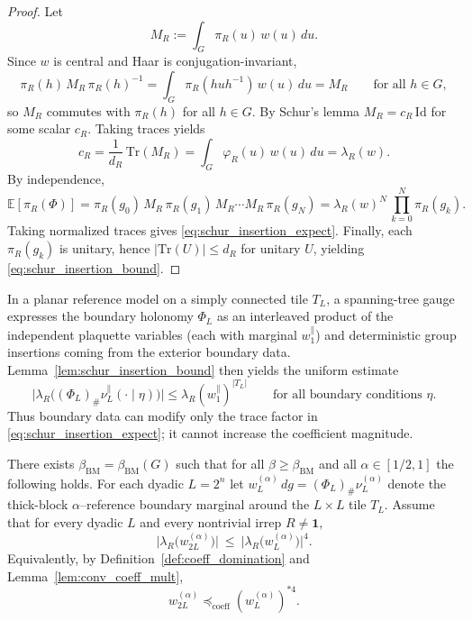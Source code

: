 \begin{proof}
Let
\[
M_R:=\int_G \pi_R(u)\,w(u)\,du.
\]
Since $w$ is central and Haar is conjugation-invariant,
\[
\pi_R(h)\,M_R\,\pi_R(h)^{-1}=\int_G \pi_R(huh^{-1})\,w(u)\,du=M_R
\qquad\text{for all }h\in G,
\]
so $M_R$ commutes with $\pi_R(h)$ for all $h\in G$.
By Schur's lemma $M_R=c_R\,\mathrm{Id}$ for some scalar $c_R$.
Taking traces yields
\[
c_R=\frac{1}{d_R}\,\mathrm{Tr}(M_R)=\int_G \varphi_R(u)\,w(u)\,du=\lambda_R(w).
\]
By independence,
\[
\mathbb E[\pi_R(\Phi)]
=
\pi_R(g_0)\,M_R\,\pi_R(g_1)\,M_R\cdots M_R\,\pi_R(g_N)
=
\lambda_R(w)^N\,\prod_{k=0}^N \pi_R(g_k).
\]
Taking normalized traces gives \eqref{eq:schur_insertion_expect}.
Finally, each $\pi_R(g_k)$ is unitary, hence $|\mathrm{Tr}(U)|\le d_R$ for unitary $U$, yielding \eqref{eq:schur_insertion_bound}.
\end{proof}

\begin{remark}\label{rem:planar_power_uniform_eta}
In a planar reference model on a simply connected tile $T_L$, a spanning-tree gauge expresses the boundary holonomy $\Phi_L$
as an interleaved product of the independent plaquette variables (each with marginal $w_1^{\parallel}$) and deterministic
group insertions coming from the exterior boundary data.
Lemma~\ref{lem:schur_insertion_bound} then yields the uniform estimate
\[
\big|\lambda_R\big((\Phi_L)_\#\nu_L^{\parallel}(\cdot\mid\eta)\big)\big|
\le \lambda_R(w_1^{\parallel})^{|T_L|}
\qquad\text{for all boundary conditions }\eta.
\]
Thus boundary data can modify only the trace factor in \eqref{eq:schur_insertion_expect}; it cannot increase the coefficient magnitude.
\end{remark}


\begin{proposition}\label{prop:BM_dyadic_local}
There exists $\beta_{\mathrm{BM}}=\beta_{\mathrm{BM}}(G)$ such that for all $\beta\ge\beta_{\mathrm{BM}}$ and all $\alpha\in[1/2,1]$ the following holds.
For each dyadic $L=2^n$ let $w_L^{(\alpha)}\,dg=(\Phi_L)_{\#}\nu_{L}^{(\alpha)}$ denote the thick-block $\alpha$--reference boundary marginal around the $L\times L$ tile $T_L$.
Assume that for every dyadic $L$ and every nontrivial irrep $R\neq\mathbf 1$,
\begin{equation}\label{eq:BM_dyadic_step_template}
\big|\lambda_R\!\bigl(w_{2L}^{(\alpha)}\bigr)\big|
\ \le\
\big|\lambda_R\!\bigl(w_{L}^{(\alpha)}\bigr)\big|^{4}.
\end{equation}
\noindent Equivalently, by Definition~\ref{def:coeff_domination} and Lemma~\ref{lem:conv_coeff_mult},
\[
w_{2L}^{(\alpha)} \preceq_{\mathrm{coeff}} (w_L^{(\alpha)})^{*4}.
\]
\end{proposition}

